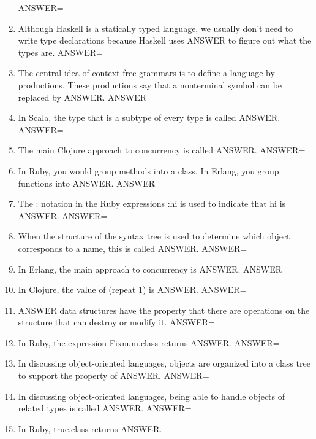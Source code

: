 \documentclass{exam}
\begin{document}
\begin{enumerate}
ANSWER=
\item Although Haskell is a statically typed language, we usually don't need to write type declarations because Haskell uses ANSWER to figure out what the types are.\newline
ANSWER=
\item The central idea of context-free grammars is to define a language by productions.  These productions say that a nonterminal symbol can be replaced by ANSWER.\newline
ANSWER=
\item In Scala, the type that is a subtype of every type is called ANSWER.\newline
ANSWER=
\item The main Clojure approach to concurrency is called ANSWER.\newline
ANSWER=
\item In Ruby, you would group methods into a class.  In Erlang, you group functions into ANSWER.\newline
ANSWER=
\item The : notation in the Ruby expressions :hi is used to indicate that hi is ANSWER.\newline
ANSWER=
\item When the structure of the syntax tree is used to determine which object corresponds to a name, this is called ANSWER.\newline
ANSWER=
\item In Erlang, the main approach to concurrency is ANSWER.\newline
ANSWER=
\item In Clojure, the value of (repeat 1) is ANSWER.\newline
ANSWER=
\item ANSWER data structures have the property that there are operations on the structure that can destroy or modify it.\newline
ANSWER=
\item In Ruby, the expression Fixnum.class returns ANSWER.\newline
ANSWER=
\item In discussing object-oriented languages, objects are organized into a class tree to support the property of ANSWER.\newline
ANSWER=
\item In discussing object-oriented languages, being able to handle objects of related types is called ANSWER.\newline
ANSWER=
\item In Ruby, true.class returns ANSWER.\newline

\end{enumerate}
\end{document}
